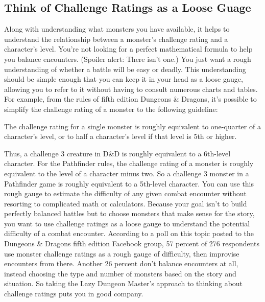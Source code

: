 \documentclass[10pt,a4paper,twoside,bg=print,twocolumn,openany,nodeprecatedcode]{dndbook}
\begin{document}
\subsection{Think of Challenge Ratings as a Loose Guage}
Along with understanding what monsters you have available, it helps to understand the relationship between a monster's challenge rating and a character's level. You're not looking for a perfect mathematical formula to help you balance encounters. (Spoiler alert: There isn't one.) You just want a rough understanding of whether a battle will be easy or deadly. This understanding should be simple enough that you can keep it in your head as a loose gauge, allowing you to refer to it without having to consult numerous charts and tables.
For example, from the rules of fifth edition Dungeons \& Dragons, it's possible to simplify the challenge rating of a monster to the following guideline:
\begin{DndSidebar}[float=!b]{}
The challenge rating for a single monster is roughly equivalent to one-quarter of a character's level, or to half a character's level if that level is 5th or higher.


\end{DndSidebar}

Thus, a challenge 3 creature in D\&D is roughly equivalent to a 6th-level character. For the Pathfinder rules, the challenge rating of a monster is roughly equivalent to the level of a character minus two. So a challenge 3 monster in a Pathfinder game is roughly equivalent to a 5th-level character.
You can use this rough gauge to estimate the difficulty of any given combat encounter without resorting to complicated math or calculators. Because your goal isn't to build perfectly balanced battles but to choose monsters that make sense for the story, you want to use challenge ratings as a loose gauge to understand the potential difficulty of a combat encounter.
According to a poll on this topic posted to the Dungeons \& Dragons fifth edition Facebook group, 57 percent of 276 respondents use monster challenge ratings as a rough gauge of difficulty, then improvise encounters from there. Another 26 percent don't balance encounters at all, instead choosing the type and number of monsters based on the story and situation.
So taking the Lazy Dungeon Master's approach to thinking about challenge ratings puts you in good company.
\end{document}
